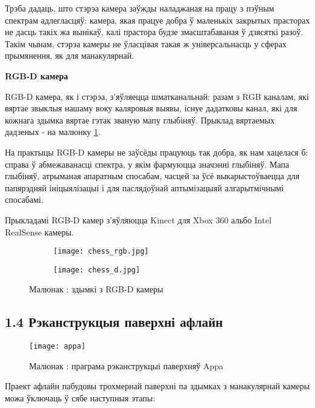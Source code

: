 Трэба дадаць, што стэрэа камера заўжды наладжаная на працу з пэўным спектрам адлегласцяў:
камера, якая працуе добра ў маленькіх закрытых прасторах не дасць такіх жа вынікаў,
калі прастора будзе змасштабаваная ў дзясяткі разоў. Такім чынам, стэрэа камеры не
ўласцівая такая ж універсальнасць у сферах прымянення, як для манакулярнай.

\vspace{5mm}
{\bf RGB-D камера}

RGB-D камера, як і стэрэа, з'яўляецца шматканальнай: разам з RGB каналам, які
вяртае звыклыя нашаму воку каляровыя выявы, існуе дадатковы канал, які для кожнага
здымка вяртае гэтак званую мапу глыбіняў. Прыклад вяртаемых дадзеных - на малюнку
\ref{fig:rgbd-example}.

На практыцы RGB-D камеры не заўсёды працуюць так добра, як нам хацелася б:
справа ў абмежаванасці спектра, у якім фармуюцца значэнні глыбіняў. Мапа глыбіняў,
атрыманая апаратным спосабам, часцей за ўсё выкарыстоўваецца для папярэдняй ініцыялізацыі
і для паслядоўнай аптымізацыяй алгарытмічнымі спосабамі.

Прыкладамі RGB-D камер з'яўляюцца Kinect для Xbox 360 альбо Intel RealSense камеры.

\begin{figure}[H]
\centering
\begin{subfigure}{.5\textwidth}
  \centering
  \texttt{[image: chess\_rgb.jpg]}
\end{subfigure}%
\begin{subfigure}{.5\textwidth}
  \centering
  \texttt{[image: chess\_d.jpg]}
\end{subfigure}
\captionsetup{labelformat=empty}
\caption{Малюнак : здымкі з RGB-D камеры}
\label{fig:rgbd-example}
\end{figure}

\subsection*{1.4 Рэканструкцыя паверхні афлайн}

\begin{figure}[H]
  \centering
  \texttt{[image: appa]}
  \captionsetup{labelformat=empty}
  \caption{Малюнак : праграма рэканструкцыі паверхняў Appa}
  \label{fig:appa}
\end{figure}

Праект афлайн пабудовы трохмернай паверхні па здымках з манакулярнай камеры можа
ўключаць ў сябе наступныя этапы:

